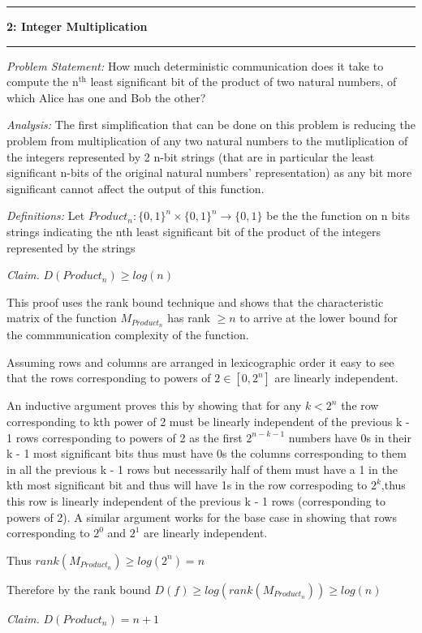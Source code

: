\documentclass[11pt]{article}
\newcommand\question[2]{\vspace{.25in}\hrule\textbf{#1: #2}\vspace{.5em}\hrule\vspace{.10in}}
\newcommand\analysis{\vspace{.10in}\emph{Analysis: }\newline}
\newcommand\problem{\emph{Problem Statement:}\newline}
\newcommand\definitions{\emph{Definitions:}\newline}
\newcommand\claim{\emph{Claim.}\newline}
\begin{document}
\newpage

\question{2}{Integer Multiplication} 
\problem
How much deterministic communication does it take to compute the $\text{n}^{\text{th}}$
least significant bit of the product of two natural numbers, of which Alice has one and Bob the other?

\analysis
The first simplification that can be done on this problem is reducing the problem from multiplication of any two natural numbers to the mutliplication of the integers represented by 2 n-bit strings (that are in particular the least significant n-bits of the original natural numbers' representation) as any bit more significant cannot affect the output of this function. 

\definitions
Let $Product_n: {\{0, 1\}}^n \times {\{0, 1\}}^n \to \{0, 1\}$ be the the function on n bits strings indicating the nth least significant bit of the product of the integers represented by the strings

\claim
$D(Product_n) \geq log(n)$ 

\proof
This proof uses the rank bound technique and shows that the characteristic matrix of the function $M_{Product_n}$ has rank $\geq n$ to arrive at the lower bound for the commmunication complexity of the function. 

Assuming rows and columns are arranged in lexicographic order it easy to see that 
the rows corresponding to powers of $2 \in [0, 2^n]$ are linearly independent. 

An inductive argument proves this by showing that for any $k < 2^n$ the row corresponding to kth power of 2 must be linearly independent of the previous k - 1 rows corresponding to powers of 2 as the first $2^{n-k-1}$ numbers have 0s in their k - 1 most significant bits thus must have 0s the columns corresponding to them in all the previous k - 1 rows but necessarily half of them must have a 1 in the kth most significant bit and thus will have 1s in the row correspoding to $2^k$,thus this row is linearly independent of the previous k - 1 rows (corresponding to powers of 2). A similar argument works for the base case in showing that rows corresponding to $2^0$ and $2^1$ are linearly independent. 

Thus $rank(M_{Product_n}) \geq log(2^n) = n$ 

Therefore by the rank bound $D(f) \geq log(rank(M_{Product_n})) \geq log(n)$\newline 


\claim
$D(Product_n) = n + 1$ 
\end{document}
